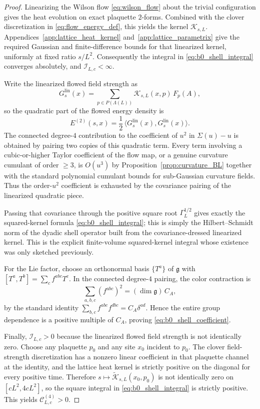 \begin{proof}
Linearizing the Wilson flow \eqref{eq:wilson_flow} about the trivial configuration gives the heat evolution on exact plaquette $2$-forms.
Combined with the clover discretization in \eqref{eq:flow_energy_def}, this yields the kernel $\mathcal K_{s,L}$.
Appendices~\ref{app:lattice_heat_kernel} and~\ref{app:lattice_parametrix} give the required Gaussian and finite-difference bounds for that linearized kernel, uniformly at fixed ratio $s/L^2$.
Consequently the integral in \eqref{eq:b0_shell_integral} converges absolutely, and $\mathcal I_{L,c}<\infty$.

Write the linearized flowed field strength as
\[
G^{\mathrm{lin}}_s(x)=\sum_{p\in P(\Lambda(L))}\mathcal K_{s,L}(x,p)\,F_p(A),
\]
so the quadratic part of the flowed energy density is
\[
E^{(2)}(s,x)=\frac12\,\langle G^{\mathrm{lin}}_s(x),G^{\mathrm{lin}}_s(x)\rangle.
\]
The connected degree-$4$ contribution to the coefficient of $u^2$ in $\Sigma(u)-u$ is obtained by pairing two copies of this quadratic term.
Every term involving a cubic-or-higher Taylor coefficient of the flow map, or a genuine curvature cumulant of order $\ge 3$, is $O(u^3)$ by Proposition~\ref{prop:curvature_BL} together with the standard polynomial cumulant bounds for sub-Gaussian curvature fields.
Thus the order-$u^2$ coefficient is exhausted by the covariance pairing of the linearized quadratic piece.

Passing that covariance through the positive square root $\Gamma_L^{1/2}$ gives exactly the squared-kernel formula \eqref{eq:b0_shell_integral}; this is simply the Hilbert--Schmidt norm of the dyadic shell operator built from the covariance-dressed linearized kernel.
This is the explicit finite-volume squared-kernel integral whose existence was only sketched previously.

For the Lie factor, choose an orthonormal basis $\{T^a\}$ of $\mathfrak g$ with
$[T^a,T^b]=\sum_c f^{abc}T^c$.
In the connected degree-$4$ pairing, the color contraction is
\[
\sum_{a,b,c}(f^{abc})^2=(\dim \mathfrak g)\,C_A,
\]
by the standard identity $\sum_{b,c}f^{abc}f^{dbc}=C_A\delta^{ad}$.
Hence the entire group dependence is a positive multiple of $C_A$, proving \eqref{eq:b0_shell_coefficient}.

Finally, $\mathcal I_{L,c}>0$ because the linearized flowed field strength is not identically zero.
Choose any plaquette $p_0$ and any site $x_0$ incident to $p_0$.
The clover field-strength discretization has a nonzero linear coefficient in that plaquette channel at the identity, and the lattice heat kernel is strictly positive on the diagonal for every positive time.
Therefore $s\mapsto \widetilde{\mathcal K}_{s,L}(x_0,p_0)$ is not identically zero on $[cL^2,4cL^2]$, so the square integral in \eqref{eq:b0_shell_integral} is strictly positive.
This yields $\mathcal C^{(4)}_{L,c}>0$.
\end{proof}

